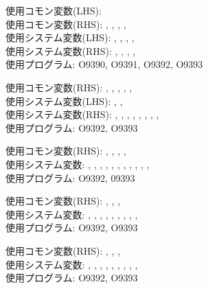 \begin{hosoku}\small
使用コモン変数(LHS): \\
使用コモン変数(RHS): , , , , \\
使用システム変数(LHS): , , , , \\
使用システム変数(RHS): , , , , \\
使用プログラム: O9390, O9391, O9392, O9393
\end{hosoku}

\begin{hosoku}\small
使用コモン変数(RHS): , , , , , \\
使用システム変数(LHS): , , \\
使用システム変数(RHS): , , , , , , , , \\
使用プログラム: O9392, O9393
\end{hosoku}

\begin{hosoku}\small
使用コモン変数(RHS): , , , , \\
使用システム変数: , , , , , , , , , , , \\
使用プログラム: O9392, 09393
\end{hosoku}

\begin{hosoku}\small
使用コモン変数(RHS): , , , \\
使用システム変数: , , , , , , , , , \\
使用プログラム: O9392, O9393
\end{hosoku}

\begin{hosoku}\small
使用コモン変数(RHS): , , , \\
使用システム変数: , , , , , , , , , \\
使用プログラム: O9392, O9393
\end{hosoku}

